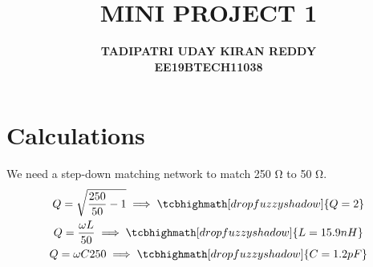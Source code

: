 \documentclass{article}
\begin{document}
\title{{\textbf{MINI PROJECT 1}}}
\author{\textbf{TADIPATRI UDAY KIRAN REDDY}\\\textbf{EE19BTECH11038}}
\maketitle

\section*{\hfil Calculations}
We need a step-down matching network to match 250 $\si{\ohm}$ to 50 $\si{\ohm}$.\\
\begin{gather*}
	Q = \sqrt{\frac{250}{50} - 1} \implies \tcbhighmath[drop fuzzy shadow]{Q = 2}\\
	Q = \frac{\omega L}{50} \implies \tcbhighmath[drop fuzzy shadow]{L = 15.9nH}\\
	Q = \omega C250 \implies \tcbhighmath[drop fuzzy shadow]{C = 1.2pF}
\end{gather*}
\end{document}
